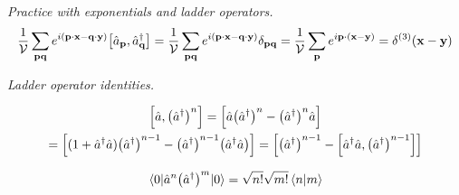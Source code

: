 \documentclass{report}
\begin{document}
\begin{subquests}
	\item \emph{Practice with exponentials and ladder operators.}
	\begin{gather*}
		\frac{1}{\cal{V}}\sum_{\vb{pq}} e^{i\pqty{\vb p \cdot\vb x - \vb q \cdot \vb y}}\bqty{\hat{a}_{\vb p}, \hat{a}_{\vb q}^{\dagger}} = \frac{1}{\cal{V}}\sum_{\vb{pq}} e^{i\pqty{\vb p \cdot \vb x - \vb q \cdot \vb y}}\delta_{\vb{pq}} = \frac{1}{\cal{V}}\sum_{\vb p}e^{i \vb p \cdot\pqty{\vb x-\vb y}} = \delta^{(3)}(\vb x - \vb y)
	\end{gather*}

	\item \emph{Ladder operator identities.}
	\begin{subquests}
		\item
		\begin{gather*}
			\bqty{\hat{a},\pqty{\hat{a}^{\dagger}}^n} = \bqty{\hat{a}\pqty{\hat{a}^{\dagger}}^n - \pqty{\hat{a}^{\dagger}}^n\hat{a}} \\
			= \bqty{(1+\hat{a}^{\dagger}\hat{a})\pqty{\hat{a}^{\dagger}}^{n-1} - \pqty{\hat{a}^{\dagger}}^{n-1}\pqty{\hat{a}^{\dagger}\hat{a}}} = \bqty{\pqty{\hat{a}^{\dagger}}^{n-1} - \bqty{\hat{a}^{\dagger}\hat{a},\pqty{\hat{a}^{\dagger}}^{n-1}}}		
		\end{gather*}

		\item
		\begin{gather*}
			\mel{0}{\hat{a}^n \pqty{\hat{a}^{\dagger}}^m}{0} = \sqrt{n!}\sqrt{m!}\braket{n}{m}
		\end{gather*}

		\item

		\item
	\end{subquests}
	

\end{subquests}
\end{document}
